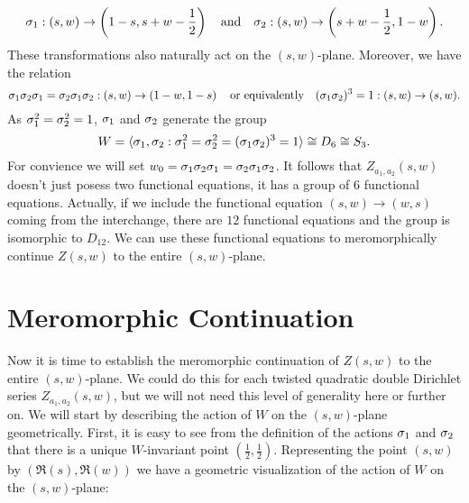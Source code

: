 \documentclass[12pt,reqno,oneside]{amsart}
\begin{document}
    \[
        \sigma_{1}:(s,w) \to \left(1-s,s+w-\frac{1}{2}\right) \quad \text{and} \quad \sigma_{2}:(s,w) \to \left(s+w-\frac{1}{2},1-w\right).
    \]
    These transformations also naturally act on the $(s,w)$-plane. Moreover, we have the relation
    \[
        \sigma_{1}\sigma_{2}\sigma_{1} = \sigma_{2}\sigma_{1}\sigma_{2}:(s,w) \to \left(1-w,1-s\right) \quad \text{or equivalently} \quad (\sigma_{1}\sigma_{2})^{3} = 1:(s,w) \to (s,w).
    \]
    As $\sigma_{1}^{2} = \sigma_{2}^{2} = 1$, $\sigma_{1}$ and $\sigma_{2}$ generate the group
    \[
        W = \langle\sigma_{1},\sigma_{2}:\sigma_{1}^{2} = \sigma_{2}^{2} = (\sigma_{1}\sigma_{2})^{3} = 1\rangle \cong D_{6} \cong S_{3}.
    \]
    For convience we will set $w_{0} = \sigma_{1}\sigma_{2}\sigma_{1} = \sigma_{2}\sigma_{1}\sigma_{2}$. It follows that $Z_{a_{1},a_{2}}(s,w)$ doesn't just posess two functional equations, it has a group of $6$ functional equations. Actually, if we include the functional equation $(s,w) \to (w,s)$ coming from the interchange, there are $12$ functional equations and the group is isomorphic to $D_{12}$. We can use these functional equations to meromorphically continue $Z(s,w)$ to the entire $(s,w)$-plane.
\section{Meromorphic Continuation}
    Now it is time to establish the meromorphic continuation of $Z(s,w)$ to the entire $(s,w)$-plane. We could do this for each twisted quadratic double Dirichlet series $Z_{a_{1},a_{2}}(s,w)$, but we will not need this level of generality here or further on. We will start by describing the action of $W$ on the $(s,w)$-plane geometrically. First, it is easy to see from the definition of the actions $\sigma_{1}$ and $\sigma_{2}$ that there is a unique $W$-invariant point $\left(\frac{1}{2},\frac{1}{2}\right)$. Representing the point $(s,w)$ by $(\Re(s),\Re(w))$ we have a geometric visualization of the action of $W$ on the $(s,w)$-plane:

    \begin{center}
    \end{center}
\end{document}

